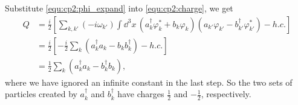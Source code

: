 \begin{problembody}
    \item Substitute \eqref{equ:cp2:phi_expand} into \eqref{equ:cp2:charge}, we get
    \begin{align}\label{equ:cp2:charge_diag}
        Q & = \frac{i}{2} \left[\sum_{k, k'} (-i\omega_{k'})
        \int \dd^3x \, \left(a^\dagger_k\varphi^\ast_k + b_k\varphi_k\right)
        \left(a_{k'} \varphi_{k'} - b^\dagger_{k'}\varphi^\ast_{k'}\right) - h.c.\right]\nonumber\\
        & = \frac{i}{2} \left[-\frac{i}{2} \sum_k \left(a^\dagger_k a_k - b_k b^\dagger_k\right) - h.c.\right]\nonumber\\
        & = \frac{1}{2} \sum_k \left(a^\dagger_k a_k - b^\dagger_k b_k\right),
    \end{align}
    where we have ignored an infinite constant in the last step. So the two sets of particles created by $a^\dagger_k$ and $b^\dagger_k$ have charges
    $\frac{1}{2}$ and $-\frac{1}{2}$, respectively.


\end{problembody}
